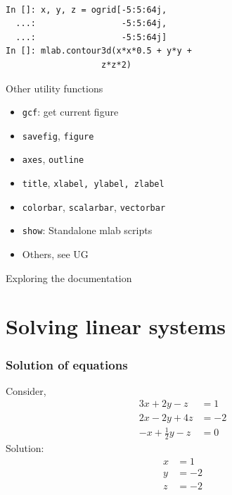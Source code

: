 \documentclass[14pt,compress]{beamer}
\newcommand{\myemph}[1]{\structure{\emph{#1}}}
\newcommand{\PythonCode}[1]{\lstinline{#1}}
\begin{document}
\begin{frame}

        \myemph{\Large 3D data}
    \vspace*{0.25in}

    \\
    
\begin{lstlisting}
In []: x, y, z = ogrid[-5:5:64j, 
  ...:                 -5:5:64j, 
  ...:                 -5:5:64j]
In []: mlab.contour3d(x*x*0.5 + y*y + 
                   z*z*2)
\end{lstlisting}
\end{frame}

\begin{frame}[plain]
    {Other utility functions}
    \begin{itemize}
        \item \PythonCode{gcf}: get current figure
            \pause
        \item \PythonCode{savefig}, \PythonCode{figure}
            \pause
        \item \PythonCode{axes}, \PythonCode{outline}
            \pause
        \item \PythonCode{title}, \PythonCode{xlabel, ylabel, zlabel}
            \pause
        \item \PythonCode{colorbar}, \PythonCode{scalarbar},
            \PythonCode{vectorbar}
            \pause
        \item \PythonCode{show}: Standalone mlab scripts
            \pause
        \item Others, see UG
    \end{itemize}
\end{frame}

\begin{frame}
    {Exploring the documentation}
    \begin{center}
    \end{center}
\end{frame}



\section{Solving linear systems}

\begin{frame}[fragile]
\frametitle{Solution of equations}
Consider,
  \begin{align*}
    3x + 2y - z  & = 1 \\
    2x - 2y + 4z  & = -2 \\
    -x + \frac{1}{2}y -z & = 0
  \end{align*}
Solution:
  \begin{align*}
    x & = 1 \\
    y & = -2 \\
    z & = -2
  \end{align*}
\end{frame}
\end{document}
